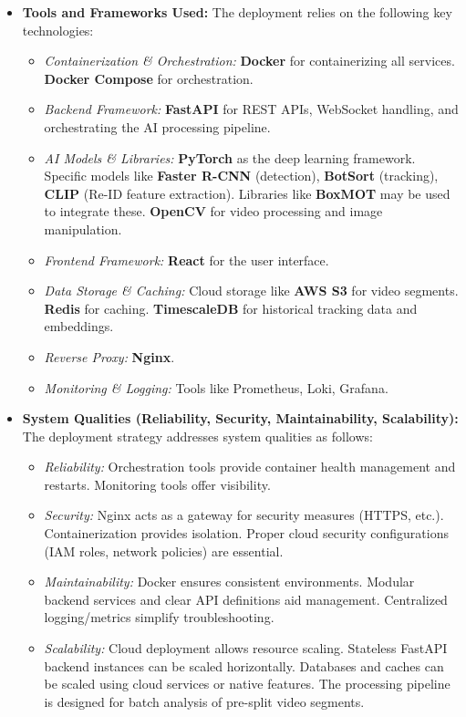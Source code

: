 \begin{itemize}
    \item \textbf{Tools and Frameworks Used:}
        The deployment relies on the following key technologies:
        \begin{itemize}
            \item \textit{Containerization \& Orchestration:} \textbf{Docker} for containerizing all services.  \textbf{Docker Compose} for orchestration.
            \item \textit{Backend Framework:} \textbf{FastAPI} for REST APIs, WebSocket handling, and orchestrating the AI processing pipeline.
            \item \textit{AI Models \& Libraries:} \textbf{PyTorch} as the deep learning framework. Specific models like \textbf{Faster R-CNN} (detection), \textbf{BotSort} (tracking), \textbf{CLIP} (Re-ID feature extraction). Libraries like \textbf{BoxMOT} may be used to integrate these. \textbf{OpenCV} for video processing and image manipulation.
            \item \textit{Frontend Framework:} \textbf{React} for the user interface.
            \item \textit{Data Storage \& Caching:} Cloud storage like \textbf{AWS S3} for video segments. \textbf{Redis} for caching. \textbf{TimescaleDB} for historical tracking data and embeddings.
            \item \textit{Reverse Proxy:} \textbf{Nginx}.
            \item \textit{Monitoring \& Logging:} Tools like Prometheus, Loki, Grafana.
        \end{itemize}

    \item \textbf{System Qualities (Reliability, Security, Maintainability, Scalability):}
        The deployment strategy addresses system qualities as follows:
        \begin{itemize}
            \item \textit{Reliability:} Orchestration tools provide container health management and restarts. Monitoring tools offer visibility.
            \item \textit{Security:} Nginx acts as a gateway for security measures (HTTPS, etc.). Containerization provides isolation. Proper cloud security configurations (IAM roles, network policies) are essential.
            \item \textit{Maintainability:} Docker ensures consistent environments. Modular backend services and clear API definitions aid management. Centralized logging/metrics simplify troubleshooting.
            \item \textit{Scalability:} Cloud deployment allows resource scaling. Stateless FastAPI backend instances can be scaled horizontally. Databases and caches can be scaled using cloud services or native features. The processing pipeline is designed for batch analysis of pre-split video segments.
        \end{itemize}
\end{itemize}

